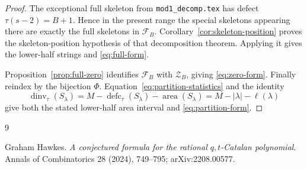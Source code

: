 \documentclass[11pt]{article}
\theoremstyle{definition}
\theoremstyle{remark}
\newcommand{\area}{\operatorname{area}}
\newcommand{\dinv}{\operatorname{dinv}}
\newcommand{\defc}{\operatorname{defc}}
\begin{document}
\begin{proof}
The exceptional full skeleton from \texttt{mod1\_decomp.tex} has defect
$\tau(s-2)=B+1$.  Hence in the present range the special skeletons appearing
there are exactly the full skeletons in $\mathcal F_B$.
Corollary~\ref{cor:skeleton-position} proves the skeleton-position hypothesis
of that decomposition theorem.  Applying it gives the lower-half strings and
\eqref{eq:full-form}.

Proposition~\ref{prop:full-zero} identifies $\mathcal F_B$ with
$\mathcal Z_B$, giving \eqref{eq:zero-form}.  Finally reindex by the bijection
$\Phi$.  Equation~\eqref{eq:partition-statistics} and the identity
\[
 \dinv_\tau(S_\lambda)
 =M-\defc_\tau(S_\lambda)-\area(S_\lambda)
 =M-|\lambda|-\ell(\lambda)
\]
give both the stated lower-half area interval and
\eqref{eq:partition-form}.
\end{proof}

\begin{thebibliography}{9}

Graham Hawkes.
\newblock \emph{A conjectured formula for the rational $q,t$-Catalan
polynomial}.
\newblock Annals of Combinatorics 28 (2024), 749--795;
arXiv:2208.00577.

\end{thebibliography}
\end{document}
